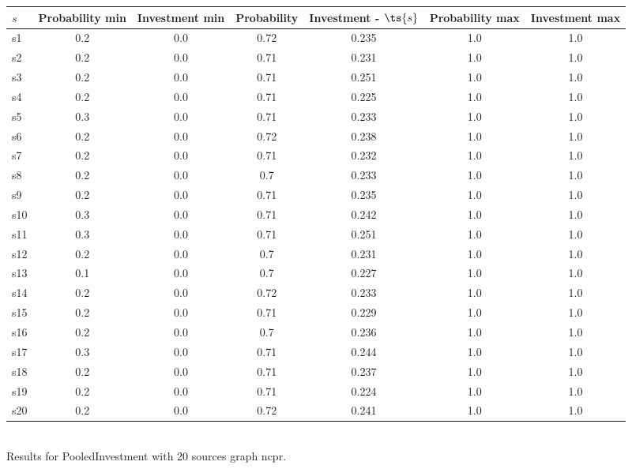 \documentclass{article}
\begin{document}
\noindent\begin{tabular}{|l|c|c|c|c|c|c|}
\hline
$s$& Probability min & Investment min & Probability & Investment - $\ts{s}$ & Probability max & Investment max\\
\hline
s1 &0.2 & 0.0 & 0.72 & 0.235 & 1.0 & 1.0\\
\hline
s2 &0.2 & 0.0 & 0.71 & 0.231 & 1.0 & 1.0\\
\hline
s3 &0.2 & 0.0 & 0.71 & 0.251 & 1.0 & 1.0\\
\hline
s4 &0.2 & 0.0 & 0.71 & 0.225 & 1.0 & 1.0\\
\hline
s5 &0.3 & 0.0 & 0.71 & 0.233 & 1.0 & 1.0\\
\hline
s6 &0.2 & 0.0 & 0.72 & 0.238 & 1.0 & 1.0\\
\hline
s7 &0.2 & 0.0 & 0.71 & 0.232 & 1.0 & 1.0\\
\hline
s8 &0.2 & 0.0 & 0.7 & 0.233 & 1.0 & 1.0\\
\hline
s9 &0.2 & 0.0 & 0.71 & 0.235 & 1.0 & 1.0\\
\hline
s10 &0.3 & 0.0 & 0.71 & 0.242 & 1.0 & 1.0\\
\hline
s11 &0.3 & 0.0 & 0.71 & 0.251 & 1.0 & 1.0\\
\hline
s12 &0.2 & 0.0 & 0.7 & 0.231 & 1.0 & 1.0\\
\hline
s13 &0.1 & 0.0 & 0.7 & 0.227 & 1.0 & 1.0\\
\hline
s14 &0.2 & 0.0 & 0.72 & 0.233 & 1.0 & 1.0\\
\hline
s15 &0.2 & 0.0 & 0.71 & 0.229 & 1.0 & 1.0\\
\hline
s16 &0.2 & 0.0 & 0.7 & 0.236 & 1.0 & 1.0\\
\hline
s17 &0.3 & 0.0 & 0.71 & 0.244 & 1.0 & 1.0\\
\hline
s18 &0.2 & 0.0 & 0.71 & 0.237 & 1.0 & 1.0\\
\hline
s19 &0.2 & 0.0 & 0.71 & 0.224 & 1.0 & 1.0\\
\hline
s20 &0.2 & 0.0 & 0.72 & 0.241 & 1.0 & 1.0\\
\hline
\end{tabular}\\

\noindent Results for PooledInvestment with 20 sources graph ncpr.
\end{document}
